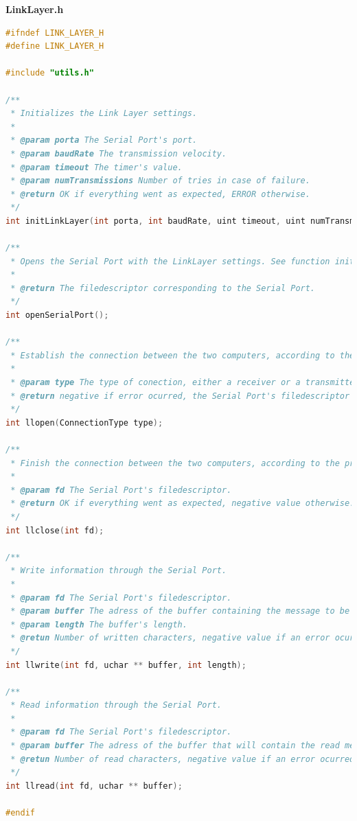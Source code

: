 \documentclass[a4paper, 11pt]{article}
\begin{document}
\huge\textbf{LinkLayer.h}
\begin{lstlisting}[language=C]
#ifndef LINK_LAYER_H
#define LINK_LAYER_H

#include "utils.h"

/**
 * Initializes the Link Layer settings.
 *
 * @param porta The Serial Port's port.
 * @param baudRate The transmission velocity.
 * @param timeout The timer's value.
 * @param numTransmissions Number of tries in case of failure.
 * @return OK if everything went as expected, ERROR otherwise.
 */
int initLinkLayer(int porta, int baudRate, uint timeout, uint numTransmissions);

/**
 * Opens the Serial Port with the LinkLayer settings. See function initLinkLayer.
 *
 * @return The filedescriptor corresponding to the Serial Port.
 */
int openSerialPort();

/**
 * Establish the connection between the two computers, according to the protocol.
 *
 * @param type The type of conection, either a receiver or a transmitter.
 * @return negative if error ocurred, the Serial Port's filedescriptor otherwise.
 */
int llopen(ConnectionType type);

/**
 * Finish the connection between the two computers, according to the protocol.
 *
 * @param fd The Serial Port's filedescriptor.
 * @return OK if everything went as expected, negative value otherwise.
 */
int llclose(int fd);

/**
 * Write information through the Serial Port.
 *
 * @param fd The Serial Port's filedescriptor.
 * @param buffer The adress of the buffer containing the message to be written.
 * @param length The buffer's length.
 * @retun Number of written characters, negative value if an error ocurred.
 */
int llwrite(int fd, uchar ** buffer, int length);

/**
 * Read information through the Serial Port.
 *
 * @param fd The Serial Port's filedescriptor.
 * @param buffer The adress of the buffer that will contain the read message.
 * @retun Number of read characters, negative value if an error ocurred.
 */
int llread(int fd, uchar ** buffer);

#endif
\end{lstlisting}
\newpage
\end{document}
